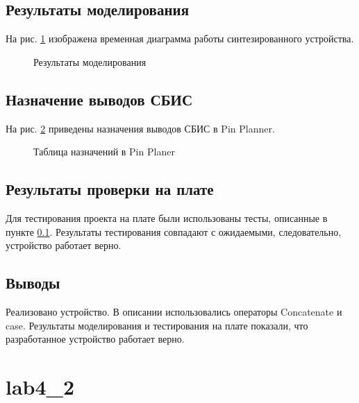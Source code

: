 \subsection{Результаты моделирования}
\label{sec:lab4_1_modeling}

На рис. \ref{fig:lab4_1_modeling} изображена временная диаграмма работы синтезированного устройства.

\begin{figure}[H]
\begin{center}
	\caption{Результаты моделирования}
	\label{fig:lab4_1_modeling}
\end{center}
\end{figure}

\subsection{Назначение выводов СБИС}

На рис. \ref{fig:lab4_1_pins} приведены назначения выводов СБИС в Pin Planner.

\begin{figure}[H]
\begin{center}
	\caption{Таблица назначений в Pin Planer}
	\label{fig:lab4_1_pins}
\end{center}
\end{figure}

\subsection{Результаты проверки на плате}

Для тестирования проекта на плате были использованы тесты, описанные в пункте \ref{sec:lab4_1_modeling}. Результаты тестирования совпадают с ожидаемыми, следовательно, устройство работает верно.

\subsection{Выводы}

Реализовано устройство. В описании использовались операторы Concatenate и case. Результаты моделирования и тестирования на плате показали, что разработанное устройство работает верно.

\newpage

\section{lab4\_2}

